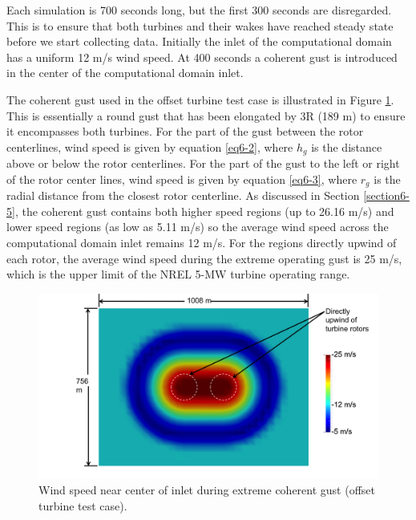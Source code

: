 Each simulation is 700 seconds long, but the first 300 seconds are disregarded. This is to ensure that both turbines and their wakes have reached steady state before we start collecting data. Initially the inlet of the computational domain has a uniform 12 m/s wind speed. At 400 seconds a coherent gust is introduced in the center of the computational domain inlet. 

The coherent gust used in the offset turbine test case is illustrated in Figure \ref{fig6-13}. This is essentially a round gust that has been elongated by 3R (189 m) to ensure it encompasses both turbines. For the part of the gust between the rotor centerlines,  wind speed is given by equation \ref{eq6-2}, where $h_g$ is the distance above or below the rotor centerlines. For the part of the gust to the left or right of the rotor center lines, wind speed is given by equation \ref{eq6-3}, where $r_g$ is the radial distance from the closest rotor centerline. As discussed in Section \ref{section6-5}, the coherent gust contains both higher speed regions (up to 26.16 m/s) and lower speed regions (as low as 5.11 m/s) so the average wind speed across the computational domain inlet remains 12 m/s. For the regions directly upwind of each rotor, the average wind speed during the extreme operating gust is 25 m/s, which is the upper limit of the NREL 5-MW turbine operating range. 

\begin{figure}[ht]  
	\centering
		\includegraphics[width = \linewidth]{Figures/ch6Figures/fig6-13.png}

	\caption{Wind speed near center of inlet during extreme coherent gust (offset turbine test case).}
\label{fig6-13}
\end{figure}

